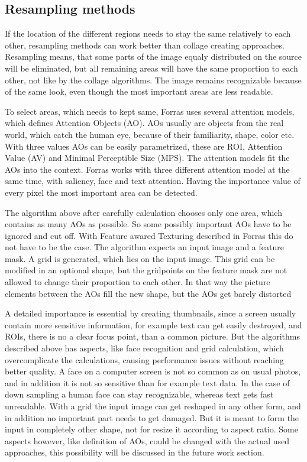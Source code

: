 \documentclass[draft,final]{vutinfth} %
\begin{document}
\subsection{Resampling methods}
If the location of the different regions needs to stay the same relatively to each other, resampling methods can work better than collage creating approaches.
Resampling means, that some parts of the image equaly distributed on the source will be eliminated, but all remaining areas will have the same proportion to each other, not like by the collage algorithms.
The image remains recognizable because of the same look, even though the most important areas are less readable.\par 
To select areas, which needs to kept same, Forras uses several attention models, which defines Attention Objects (AO).
AOs usually are objects from the real world, which catch the human eye, because of their familiarity, shape, color etc.
With three values AOs can be easily parametrized, these are ROI, Attention Value (AV) and Minimal Perceptible Size (MPS).
The attention models fit the AOs into the context.
Forras works with three different attention model at the same time, with saliency, face and text attention.
Having the importance value of every pixel the most important area can be detected.\par 
The algorithm above after carefully calculation chooses only one area, which contains as many AOs as possible.
So some possibly important AOs have to be ignored and cut off.
With Feature awared Texturing described in Forras this do not have to be the case.
The algorithm expects an input image and a feature mask.
A grid is generated, which lies on the input image.
This grid can be modified in an optional shape, but the gridpoints on the feature mask are not allowed to change their proportion to each other.
In that way the picture elements between the AOs fill the new shape, but the AOs get barely distorted\par 
A detailed importance is essential by creating thumbnails, since a screen usually contain more sensitive information, for example text can get easily destroyed, and ROIs, there is no a clear focus point, than a common picture. 
But the algorithms described above has aspects, like face recognition and grid calculation, which overcomplicate the calculations, causing performance issues without reaching better quality.
A face on a computer screen is not so common as on usual photos, and in addition it is not so sensitive than for example text data.
In the case of down sampling a human face can stay recognizable, whereas text gets fast unreadable. 
With a grid the input image can get reshaped in any other form, and in addition no important part needs to get damaged.
But it is meant to form the input in completely other shape, not for resize it according to aspect ratio.
Some aspects however, like definition of AOs, could be changed with the actual used approaches, this possibility will be discussed in the future work section.
\end{document}
